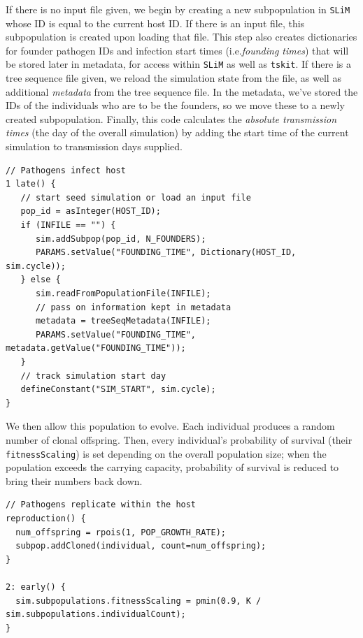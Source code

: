 \documentclass[12pt]{article}
\newcommand{\tskit}[0]{\texttt{tskit}\xspace}
\newcommand{\slim}[0]{\texttt{SLiM}\xspace}
\newcommand*{\ie}{i.e.\xcomma}
\begin{document}
If there is no input file given,
we begin by creating a new subpopulation in \slim whose ID is equal to the current host ID.
If there is an input file, this subpopulation is created upon loading that file.
This step also creates dictionaries for founder pathogen IDs and infection start times (\ie \textit{founding times})
that will be stored later in metadata, for access within \slim as well as \tskit.
If there is a tree sequence file given,
we reload the simulation state from the file,
as well as additional \emph{metadata} from the tree sequence file.
In the metadata, we've stored the IDs of the individuals who are to be the founders,
so we move these to a newly created subpopulation.
Finally, this code
calculates the \textit{absolute transmission times} (the day of the overall simulation) by adding the start time of the current simulation to transmission days supplied.
\begin{lstlisting}[language=slim, style=slimstyle, breaklines=true]
// Pathogens infect host
1 late() {
   // start seed simulation or load an input file
   pop_id = asInteger(HOST_ID);
   if (INFILE == "") {
      sim.addSubpop(pop_id, N_FOUNDERS);
      PARAMS.setValue("FOUNDING_TIME", Dictionary(HOST_ID, sim.cycle));
   } else {
      sim.readFromPopulationFile(INFILE);
      // pass on information kept in metadata
      metadata = treeSeqMetadata(INFILE);
      PARAMS.setValue("FOUNDING_TIME", metadata.getValue("FOUNDING_TIME"));
   }
   // track simulation start day
   defineConstant("SIM_START", sim.cycle);
}
\end{lstlisting}

We then allow this population to evolve.
Each individual produces a random number of clonal offspring.
Then, every individual's probability of survival
(their \verb|fitnessScaling|) is set depending on the overall population size;
when the population exceeds the carrying capacity,
probability of survival is reduced to bring their numbers back down.
\begin{lstlisting}[language=slim, style=slimstyle, breaklines=true]
// Pathogens replicate within the host
reproduction() {
  num_offspring = rpois(1, POP_GROWTH_RATE);
  subpop.addCloned(individual, count=num_offspring);
}

2: early() {
  sim.subpopulations.fitnessScaling = pmin(0.9, K / sim.subpopulations.individualCount);
}
\end{lstlisting}
\end{document}
